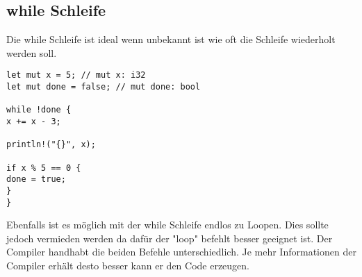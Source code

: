 \subsection{while Schleife}
Die while Schleife ist ideal wenn unbekannt ist wie oft die Schleife wiederholt werden soll.

\begin{lstlisting}
let mut x = 5; // mut x: i32
let mut done = false; // mut done: bool

while !done {
x += x - 3;

println!("{}", x);

if x % 5 == 0 {
done = true;
}
}
\end{lstlisting}

Ebenfalls ist es möglich mit der while Schleife endlos zu Loopen. Dies sollte jedoch vermieden werden da dafür der "loop" befehlt besser geeignet ist. Der Compiler handhabt die beiden Befehle unterschiedlich. Je mehr Informationen der Compiler erhält desto besser kann er den Code erzeugen.